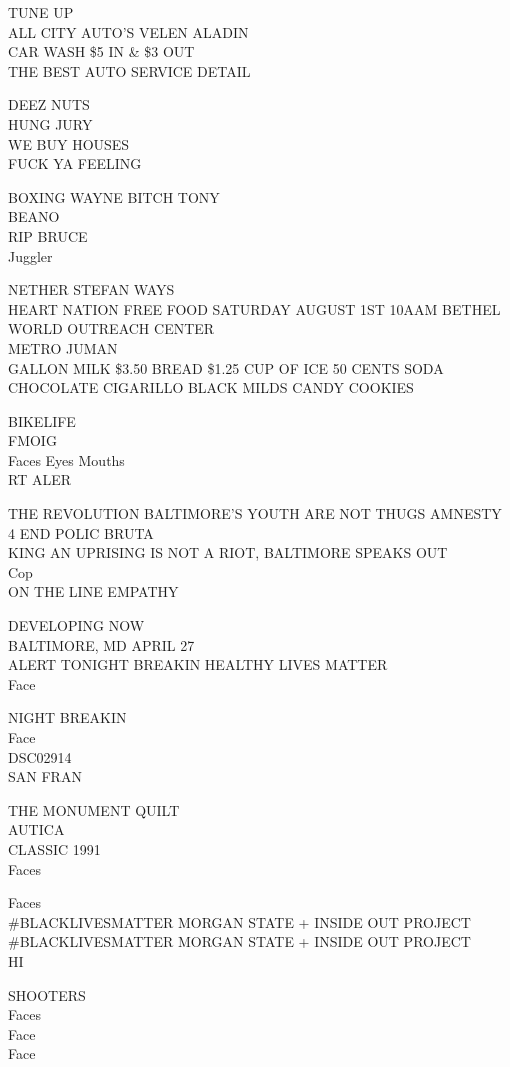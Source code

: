 \documentclass[10pt,letterpaper]{article}
\begin{document}
TUNE UP\\
ALL CITY AUTO'S VELEN ALADIN\\
CAR WASH \$5 IN \& \$3 OUT\\
THE BEST AUTO SERVICE DETAIL

DEEZ NUTS\\
HUNG JURY\\
WE BUY HOUSES\\
FUCK YA FEELING

BOXING WAYNE BITCH TONY\\
BEANO\\
RIP BRUCE\\
Juggler

NETHER STEFAN WAYS\\
HEART NATION FREE FOOD SATURDAY AUGUST 1ST 10AAM BETHEL WORLD OUTREACH CENTER\\
METRO JUMAN\\
GALLON MILK \$3.50 BREAD \$1.25 CUP OF ICE 50 CENTS SODA CHOCOLATE CIGARILLO BLACK MILDS CANDY COOKIES

BIKELIFE\\
FMOIG\\
Faces Eyes Mouths\\
RT ALER

THE REVOLUTION BALTIMORE'S YOUTH ARE NOT THUGS AMNESTY 4 END POLIC BRUTA\\
KING AN UPRISING IS NOT A RIOT, BALTIMORE SPEAKS OUT\\
Cop\\
ON THE LINE EMPATHY

DEVELOPING NOW\\
BALTIMORE, MD APRIL 27\\
ALERT TONIGHT BREAKIN HEALTHY LIVES MATTER\\
Face

NIGHT BREAKIN\\
Face\\
DSC02914\\
SAN FRAN

THE MONUMENT QUILT\\
AUTICA\\
CLASSIC 1991\\
Faces

Faces\\
\#BLACKLIVESMATTER MORGAN STATE + INSIDE OUT PROJECT\\
\#BLACKLIVESMATTER MORGAN STATE + INSIDE OUT PROJECT\\
HI

SHOOTERS\\
Faces\\
Face\\
Face
\end{document}
